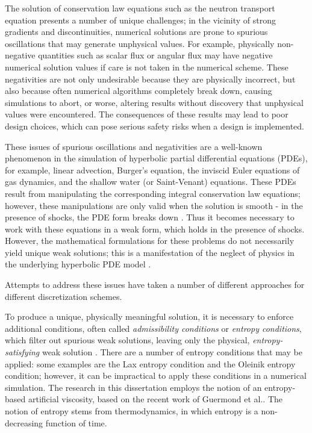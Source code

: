 The solution of conservation law equations such as the neutron transport
equation presents a number of unique challenges; in the vicinity of strong
gradients and discontinuities, numerical solutions are prone to spurious
oscillations that may generate unphysical values. For example, physically
non-negative quantities such as scalar flux or angular flux may have negative
numerical solution values if care is not taken in the numerical scheme.
These negativities are not only undesirable because they are physically
incorrect, but also because often numerical algorithms completely break
down, causing simulations to abort, or worse, altering results without
discovery that unphysical values were encountered. The consequences of
these results may lead to poor design choices, which can pose serious safety
risks when a design is implemented.

These issues of spurious oscillations and negativities are a well-known
phenomenon in the simulation of hyperbolic partial differential equations (PDEs),
for example, linear advection, Burger's equation, the inviscid Euler equations
of gas dynamics, and the shallow water (or Saint-Venant) equations.
These PDEs result from manipulating the corresponding integral
conservation law equations; however, these manipulations are only valid when
the solution is smooth - in the presence of shocks, the PDE form breaks down
\cite{leveque2002}. Thus it becomes necessary to work with
these equations in a weak form, which holds in the presence of shocks.
However, the mathematical formulations for these problems
do not necessarily yield unique weak solutions; this is a manifestation of the
neglect of physics in the underlying hyperbolic PDE model
\cite{leveque2002}.

Attempts to address these issues have taken a number
of different approaches for different discretization schemes.

To produce a unique, physically meaningful solution, it is necessary to
enforce additional conditions, often called \emph{admissibility conditions}
or \emph{entropy conditions}, which filter out spurious weak solutions,
leaving only the physical, \emph{entropy-satisfying} weak solution
\cite{leveque2002}.
There are a number of entropy conditions that may be applied: some
examples are the Lax entropy condition and the Oleinik entropy
condition\cite{leveque2002}; however, it can be impractical
to apply these conditions in a numerical simulation. The research in this
dissertation employs the notion of an entropy-based artificial viscosity,
based on the recent work of Guermond et al.\cite{guermond_ev}.
The notion of entropy stems from
thermodynamics, in which entropy is a non-decreasing function of time.
